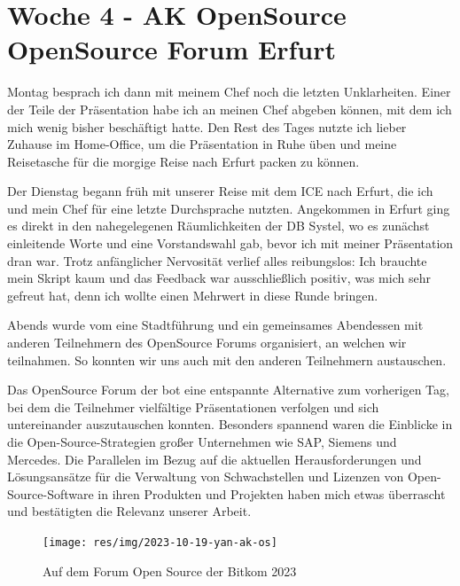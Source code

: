 \section{Woche 4 - AK OpenSource \headerand OpenSource Forum Erfurt} \label{sec:bericht-wo-4}


\lweekdaymarginpar{\weekdayMondayLong}

Montag besprach ich dann mit meinem Chef noch die letzten Unklarheiten.
Einer der Teile der Präsentation habe ich an meinen Chef abgeben können, mit dem ich mich wenig bisher beschäftigt hatte.
Den Rest des Tages nutzte ich lieber Zuhause im Home-Office, um die Präsentation in Ruhe üben und meine Reisetasche für die morgige Reise nach Erfurt packen zu können.

\sweekdaymarginpar{\weekdayTuesdayLong}

Der Dienstag begann früh mit unserer Reise mit dem ICE nach Erfurt, die ich und mein Chef für eine letzte Durchsprache nutzten.
Angekommen in Erfurt ging es direkt in den nahegelegenen Räumlichkeiten der DB Systel, wo es zunächst einleitende Worte und eine Vorstandswahl gab, bevor ich mit meiner Präsentation dran war.
Trotz anfänglicher Nervosität verlief alles reibungslos:
Ich brauchte mein Skript kaum und das Feedback war ausschließlich positiv, was mich sehr gefreut hat, denn ich wollte einen Mehrwert in diese Runde bringen.

Abends wurde vom {\bitkom} eine Stadtführung und ein gemeinsames Abendessen mit anderen Teilnehmern des OpenSource Forums organisiert, an welchen wir teilnahmen.
So konnten wir uns auch mit den anderen Teilnehmern austauschen.

\sweekdaymarginpar{\weekdayWednesdayLong}

Das OpenSource Forum der {\bitkom} bot eine entspannte Alternative zum vorherigen Tag, bei dem die Teilnehmer vielfältige Präsentationen verfolgen und sich untereinander auszutauschen konnten.
Besonders spannend waren die Einblicke in die Open-Source-Strategien großer Unternehmen wie SAP, Siemens und Mercedes.
Die Parallelen im Bezug auf die aktuellen Herausforderungen und Lösungsansätze für die Verwaltung von Schwachstellen und Lizenzen von Open-Source-Software in ihren Produkten und Projekten haben mich etwas überrascht und bestätigten die Relevanz unserer Arbeit.

\begin{figure}[htbp] %
    \centering
    \texttt{[image: res/img/2023-10-19-yan-ak-os]}
    \caption{Auf dem Forum Open Source der Bitkom 2023}
    \label{fig:foss23-yan}
\end{figure}

